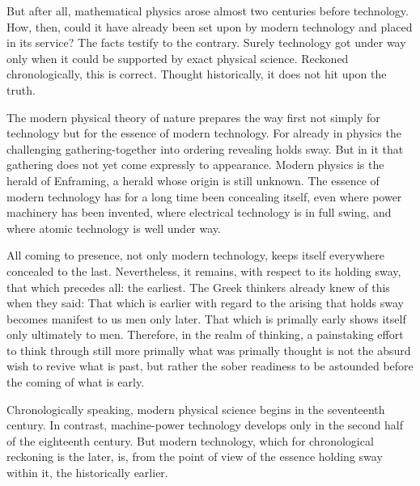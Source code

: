 But after all, mathematical physics arose almost two centuries before technology. How, then, could it have already been set upon by modern technology and placed in its service? The facts testify to the contrary. Surely technology got under way only when it could be supported by exact physical science. Reckoned chronologically, this is correct. Thought historically, it does not hit upon the truth.

The modern physical theory of nature prepares the way first not simply for technology but for the essence of modern technology. For already in physics the challenging gathering-together into ordering revealing holds sway. But in it that gathering does not yet come expressly to appearance. Modern physics is the herald of Enframing, a herald whose origin is still unknown. The essence of modern technology has for a long time been concealing itself, even where power machinery has been invented, where electrical technology is in full swing, and where atomic technology is well under way.

All coming to presence, not only modern technology, keeps itself everywhere concealed to the last. Nevertheless, it remains, with respect to its holding sway, that which precedes all: the earliest. The Greek thinkers already knew of this when they said: That which is earlier with regard to the arising that holds sway becomes manifest to us men only later. That which is primally early shows itself only ultimately to men. Therefore, in the realm of thinking, a painstaking effort to think through still more primally what was primally thought is not the absurd wish to revive what is past, but rather the sober readiness to be astounded before the coming of what is early.

Chronologically speaking, modern physical science begins in the seventeenth century. In contrast, machine-power technology develops only in the second half of the eighteenth century. But modern technology, which for chronological reckoning is the later, is, from the point of view of the essence holding sway within it, the historically earlier.


